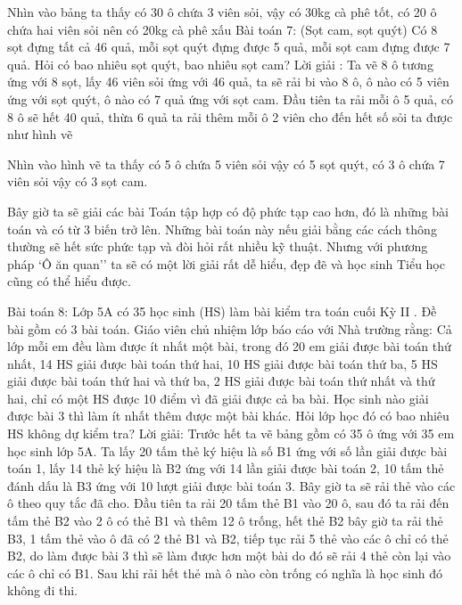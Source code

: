 \begin{multicols}{2}
	
	
	
	
	
	
	
	
	
	
	
	
	
	
	
	
	
	
	
	
	
	
	
	
	
	Nhìn vào bảng ta thấy có 30 ô chứa 3 viên sỏi, vậy có 30kg cà phê tốt, có 20 ô chứa hai viên sỏi nên có 20kg cà phê xấu
	Bài toán 7: (Sọt cam, sọt quýt)
	Có 8 sọt đựng tất cả 46 quả, mỗi sọt quýt đựng được 5 quả, mỗi sọt cam đựng được 7 quả. Hỏi có bao nhiêu sọt quýt, bao nhiêu sọt cam?
	Lời giải :
	Ta vẽ 8 ô tương ứng với 8 sọt, lấy 46 viên sỏi ứng với 46 quả, ta sẽ rải bi vào 8 ô, ô nào có 5 viên ứng với sọt quýt, ô nào có 7 quả ứng với sọt cam. Đầu tiên ta rải mỗi ô 5 quả, có 8 ô sẽ hết 40 quả, thừa 6 quả ta rải thêm mỗi ô 2 viên cho đến hết số sỏi ta được như hình vẽ
	
	Nhìn vào hình vẽ ta thấy có 5 ô chứa 5 viên sỏi vậy có 5 sọt quýt, có 3 ô chứa 7 viên sỏi vậy có
	3 sọt cam.
	
	Bây giờ ta sẽ giải các bài Toán tập hợp có độ phức tạp cao hơn, đó là những bài toán và có từ 3 biến trở lên. Những bài toán này nếu giải bằng các cách thông thường sẽ hết sức phức tạp và đòi hỏi rất nhiều kỹ thuật. Nhưng với phương pháp ‘Ô ăn quan’’ ta sẽ có một lời giải rất dễ hiểu, đẹp đẽ và học sinh Tiểu học cũng có thể hiểu được.
	
	Bài toán 8: Lớp 5A có 35 học sinh (HS) làm bài kiểm tra toán cuối Kỳ II . Đề bài gồm có 3 bài toán. Giáo viên chủ nhiệm lớp báo cáo với Nhà trường rằng: Cả lớp mỗi em đều làm được ít nhất một bài, trong đó 20 em giải được bài toán thứ nhất, 14 HS giải được bài toán thứ hai, 10 HS giải được bài toán thứ ba, 5 HS giải được bài toán thứ hai và thứ ba, 2 HS giải được bài toán thứ nhất và thứ hai, chỉ có một HS được 10 điểm vì đã giải được cả ba bài. Học sinh nào giải được bài 3 thì làm ít nhất thêm được một bài khác.
	Hỏi lớp học đó có bao nhiêu HS không dự kiểm tra?
	Lời giải:
	Trước hết ta vẽ bảng gồm có 35 ô ứng với 35 em học sinh lớp 5A. Ta lấy 20 tấm thẻ ký hiệu là số B1 ứng với số lần giải được bài toán 1, lấy 14 thẻ ký hiệu là B2 ứng với 14 lần giải được bài toán 2, 10 tấm thẻ đánh dấu là B3 ứng với 10 lượt giải được bài toán 3. Bây giờ ta sẽ rải thẻ vào các ô theo quy tắc đã cho. Đầu tiên ta rải 20 tấm thẻ B1 vào 20 ô, sau đó ta rải đến tấm thẻ B2 vào 2 ô có thẻ B1 và thêm 12 ô trống, hết thẻ B2 bây giờ ta rải thẻ B3, 1 tấm thẻ vào ô đã có 2 thẻ B1 và B2, tiếp tục rải 5 thẻ vào các ô chỉ có thẻ B2, do làm được bài 3 thì sẽ làm được hơn một bài do đó sẽ rải 4 thẻ còn lại vào các ô chỉ có B1. Sau khi rải hết thẻ mà ô nào còn trống có nghĩa là học sinh đó không đi thi.
	

\end{multicols}
